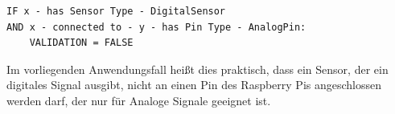 \newline
\begin{lstlisting}[caption={Semantische Validierung Digitaler Sensor},captionpos=b,showstringspaces=false, basicstyle=\small,label={lst:sensor_dtype}]
IF x - has Sensor Type - DigitalSensor
AND x - connected to - y - has Pin Type - AnalogPin:
	VALIDATION = FALSE
\end{lstlisting}
\newline
Im vorliegenden Anwendungsfall heißt dies praktisch, dass ein Sensor, der ein digitales Signal ausgibt, nicht an einen Pin des Raspberry Pis angeschlossen werden darf, der nur für Analoge Signale geeignet ist. 
